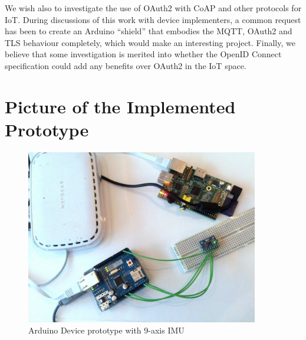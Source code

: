 \documentclass{llncs}
\begin{document}
We wish also to investigate the use of OAuth2 with CoAP and other protocols for IoT. During discussions of this work with device implementers, a common request has been to create an Arduino ``shield'' that embodies the MQTT, OAuth2 and TLS behaviour completely, which would make an interesting project.
Finally, we believe that some investigation is merited into whether the OpenID Connect specification could add any benefits over OAuth2 in the IoT space.




%



\appendix
\FloatBarrier
\section{Picture of the Implemented Prototype}\label{app:ard}
\begin{figure}[!t]
\centering
\includegraphics[width=4in]{arduino-device.png}
\caption{Arduino Device prototype with 9-axis IMU}
\label{fig:arduino-device}
\end{figure}
\FloatBarrier
\end{document}
